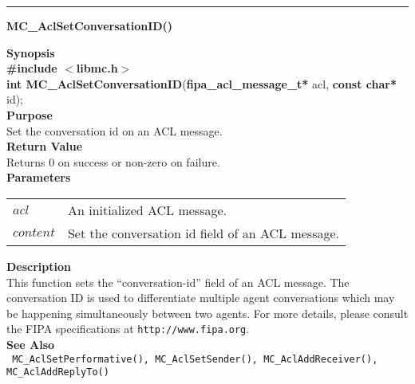 \noindent
\vspace{5pt}
\rule{6.5in}{0.015in}
\noindent
{}
{\LARGE \bf MC\_AclSetConversationID()}\\
\label{api:MC_Acl_SetConversationID()}

\noindent
{\bf Synopsis}\\
{\bf \#include $<$libmc.h$>$}\\
{\bf int MC\_AclSetConversationID}({\bf fipa\_acl\_message\_t*} acl, {\bf const char*} id);\\

\noindent
{\bf Purpose}\\
Set the conversation id on an ACL message.\\

\noindent
{\bf Return Value}\\
Returns 0 on success or non-zero on failure.\\

\noindent
{\bf Parameters}
\vspace{-0.1in}
\begin{description}
\item
\begin{tabular}{p{10 mm}p{145 mm}} 
$acl$ & An initialized ACL message. \\
$content$ & Set the conversation id field of an ACL message.
\end{tabular}
\end{description}

\noindent
{\bf Description}\\
This function sets the ``conversation-id'' field of an ACL message. 
The conversation ID is used to differentiate multiple agent conversations which
may be happening simultaneously between two agents. For more details, please
consult the FIPA specifications at \texttt{http://www.fipa.org}.\\

\noindent
{\bf See Also}\\
\texttt{
  MC\_AclSetPerformative(), MC\_AclSetSender(), MC\_AclAddReceiver(), 
    \linebreak MC\_AclAddReplyTo()
}

